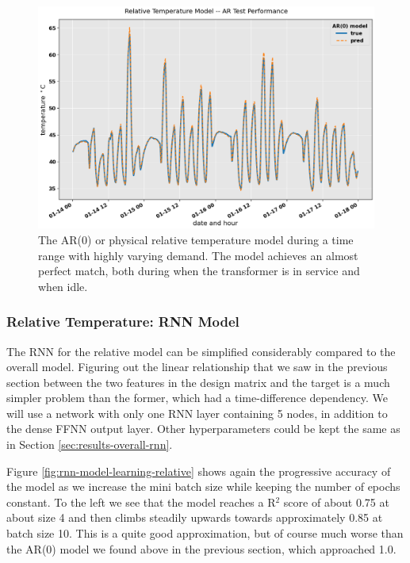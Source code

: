 \documentclass[]{article}
\begin{document}
\begin{figure}[!h]
	\centering
	\includegraphics[width=1\linewidth]{./figs/ar-model-performance-relative.png}
	\caption{The AR($0$) or physical relative temperature model during a time range with highly varying demand. The model achieves an almost perfect match, both during when the transformer is in service and when idle.}
	\label{fig:ar-model-performance-relative}
\end{figure}



\subsubsection{Relative Temperature: RNN Model} \label{sec:results-relative-rnn}
The RNN for the relative model can be simplified considerably compared to the overall model. Figuring out the linear relationship that we saw in the previous section between the two features in the design matrix and the target is a much simpler problem than the former, which had a time-difference dependency. We will use a network with only one RNN layer containing 5 nodes, in addition to the dense FFNN output layer. Other hyperparameters could be kept the same as in Section \ref{sec:results-overall-rnn}. 

Figure \ref{fig:rnn-model-learning-relative} shows again the progressive accuracy of the model as we increase the mini batch size while keeping the number of epochs constant. To the left we see that the model reaches a R$^2$ score of about 0.75 at about size 4 and then climbs steadily upwards towards approximately 0.85 at batch size 10. This is a quite good approximation, but of course much worse than the AR($0$) model we found above in the previous section, which approached 1.0. 
\end{document}
